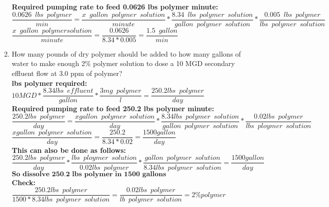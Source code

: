 \begin{enumerate}
\vspace{0.25cm}
\textbf{Required pumping rate to feed 0.0626 lbs polymer minute:}\\
$\dfrac{0.0626 \enspace lbs \enspace polymer}{min}=\dfrac{x \enspace gallon \enspace polymer  \enspace solution}{minute}*\dfrac{8.34 \enspace lbs \enspace polymer \enspace solution}{gallon \enspace polymer \enspace solution}*\dfrac{0.005 \enspace lbs \enspace polymer}{lbs \enspace polymer \enspace solution}$\\
\vspace{0.25cm}
$\dfrac{x \enspace gallon \enspace polymer solution}{minute}=\dfrac{0.0626}{8.34*0.005}=\boxed{\dfrac{1.5 \enspace gallon}{min}}$\\
\vspace{0.25cm}
\item How many pounds of dry polymer should be added to how many gallons  of water  to make enough 2\% polymer  solution to dose a 10 MGD secondary  effluent flow at 3.0 ppm of polymer?\\
\vspace{0.25cm}
\textbf{lbs polymer required:}\\
$10 MGD*\dfrac{8.34lbs \enspace effluent}{gallon}*\dfrac{3mg \enspace polymer}{l}=\dfrac{250.2 lbs \enspace polymer}{day}$\\
\vspace{0.25cm}
\textbf{Required pumping rate to feed 250.2 lbs polymer minute:}\\
$\dfrac{250.2 lbs \enspace polymer}{day}=\dfrac{x gallon \enspace polymer \enspace solution}{day}*\dfrac{8.34 lbs \enspace polymer \enspace solution}{gallon \enspace polymer \enspace solution}*\dfrac{0.02 lbs \enspace polymer}{lbs \enspace ploymer \enspace solution}$\\

\vspace{0.25cm}
$\dfrac{x gallon \enspace polymer \enspace solution}{day}=\dfrac{250.2}{8.34*0.02}=\boxed{\dfrac{1500 gallon}{day}}$\\
\vspace{0.25cm}
\textbf{This can also be done as follows:}\\
$\dfrac{250.2 lbs \enspace polymer}{day}*\dfrac{lbs \enspace ploymer \enspace solution}{0.02 lbs \enspace polymer}*\dfrac{gallon \enspace polymer \enspace solution}{8.34 lbs \enspace polymer \enspace solution}=\boxed{\dfrac{1500 gallon}{day}}$\\
\vspace{0.25cm}
$\boxed{\textbf{So dissolve 250.2 lbs polymer in 1500 gallons}}$\\
\vspace{0.25cm}
\textbf{Check:}
$\dfrac{250.2lbs \enspace polymer}{1500*8.34 lbs \enspace polymer \enspace solution}=\dfrac{0.02 lbs \enspace polymer}{lb \enspace polymer \enspace solution}=2\% polymer$
\vspace{0.25cm}


\end{enumerate}
